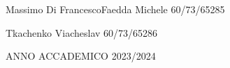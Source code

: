 {\large Massimo Di Francesco\hfill{}Faedda Michele 60/73/65285~}{\large \par}

\begin{spacing}{0.90}
{\large \hfill{}Tkachenko Viacheslav 60/73/65286}{\large \par}
\end{spacing}


\begin{center}
ANNO ACCADEMICO 2023/2024\par 
\end{center}

